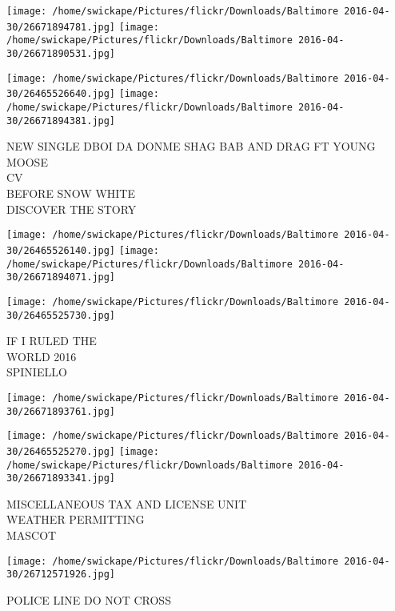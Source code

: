 \documentclass[10pt,letterpaper]{article}
\begin{document}
\texttt{[image: /home/swickape/Pictures/flickr/Downloads/Baltimore 2016-04-30/26671894781.jpg]}
\texttt{[image: /home/swickape/Pictures/flickr/Downloads/Baltimore 2016-04-30/26671890531.jpg]}

\texttt{[image: /home/swickape/Pictures/flickr/Downloads/Baltimore 2016-04-30/26465526640.jpg]}
\texttt{[image: /home/swickape/Pictures/flickr/Downloads/Baltimore 2016-04-30/26671894381.jpg]}

NEW SINGLE DBOI DA DONME SHAG BAB AND DRAG FT YOUNG MOOSE\\
CV\\
BEFORE SNOW WHITE\\
DISCOVER THE STORY
\pagebreak

\texttt{[image: /home/swickape/Pictures/flickr/Downloads/Baltimore 2016-04-30/26465526140.jpg]}
\texttt{[image: /home/swickape/Pictures/flickr/Downloads/Baltimore 2016-04-30/26671894071.jpg]}

\texttt{[image: /home/swickape/Pictures/flickr/Downloads/Baltimore 2016-04-30/26465525730.jpg]}

IF I RULED THE\\
WORLD 2016\\
SPINIELLO
\pagebreak

\texttt{[image: /home/swickape/Pictures/flickr/Downloads/Baltimore 2016-04-30/26671893761.jpg]}

\vspace{0.25in}
\texttt{[image: /home/swickape/Pictures/flickr/Downloads/Baltimore 2016-04-30/26465525270.jpg]}
\texttt{[image: /home/swickape/Pictures/flickr/Downloads/Baltimore 2016-04-30/26671893341.jpg]}

MISCELLANEOUS TAX AND LICENSE UNIT\\
WEATHER PERMITTING\\
MASCOT
\pagebreak

\texttt{[image: /home/swickape/Pictures/flickr/Downloads/Baltimore 2016-04-30/26712571926.jpg]}

POLICE LINE DO NOT CROSS
\pagebreak
\end{document}
